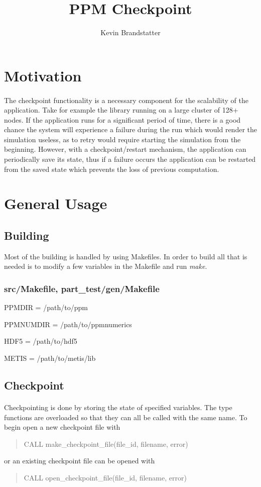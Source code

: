 \documentclass{article}
\title{PPM Checkpoint}
\author{Kevin Brandstatter}
\begin{document}
\maketitle
\section{Motivation}
\paragraph{}
The checkpoint functionality is a necessary component for the scalability of the application. Take for example the library running on a large cluster of 128+ nodes. If the application runs for a significant period of time, there is a good chance the system will experience a failure during the run which would render the simulation useless, as to retry would require starting the simulation from the beginning. However, with a checkpoint/restart mechanism, the application can periodically save its state, thus if a failure occurs the application can be restarted from the saved state which prevents the loss of previous computation.
\section{General Usage}
\subsection{Building}
Most of the building is handled by using Makefiles. In order to build all that is needed is to modify a few variables in the Makefile and run \emph{make}.
\subsubsection{src/Makefile, part\_test/gen/Makefile}
\begin{list}{}{}
\item PPMDIR = /path/to/ppm
\item PPMNUMDIR = /path/to/ppmnumerics
\item HDF5 = /path/to/hdf5
\item METIS = /path/to/metis/lib
\end{list}

\subsection{Checkpoint}
\paragraph{}
Checkpointing is done by storing the state of specified variables. The type functions are overloaded so that they can all be called with the same name. To begin open a new checkpoint file with
\begin{quote}
CALL make\_checkpoint\_file(file\_id, filename, error)
\end{quote}
or an existing checkpoint file can be opened with
\begin{quote}
   CALL open\_checkpoint\_file(file\_id, filename, error)
\end{quote}
\end{document}
